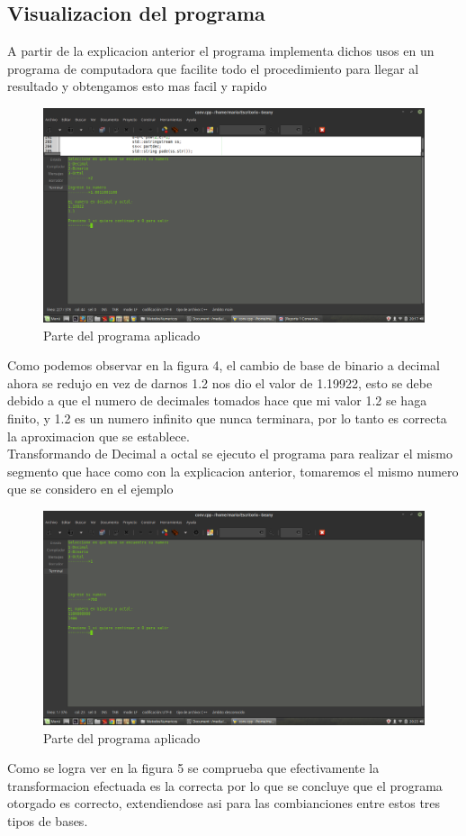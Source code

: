 \documentclass{article}
\begin{document}
\begin{multicols}{2}
\section{Visualizacion del programa}
\label{sec:Vis}
A partir de la explicacion anterior el programa implementa dichos usos en un programa de computadora que facilite todo el procedimiento para llegar al resultado y obtengamos esto mas facil y rapido
\begin{figure}[H]	
\centering
\includegraphics[scale=0.125]{Conversion.png}
\caption{Parte del programa aplicado}
	\end{figure}
Como podemos observar en la figura 4, el cambio de base de binario a decimal ahora se redujo en vez de darnos 1.2 nos dio el valor de 1.19922, esto se debe debido a que el numero de decimales tomados hace que mi valor 1.2 se haga finito, y 1.2 es un numero infinito que nunca terminara, por lo tanto es correcta la aproximacion que se establece. 
\\
Transformando de Decimal a octal se ejecuto el programa para realizar el mismo segmento que hace como con la explicacion anterior, tomaremos el mismo numero que se considero en el ejemplo
\begin{figure}[H]	
\centering
\includegraphics[scale=0.125]{Conversion2.png}
\caption{Parte del programa aplicado}
	\end{figure}
	Como se logra ver en la figura 5 se comprueba que efectivamente la transformacion efectuada es la correcta por lo que se concluye que el programa otorgado es correcto, extendiendose asi para las combianciones entre estos tres tipos de bases.
	
	
\end{multicols}
\end{document}

